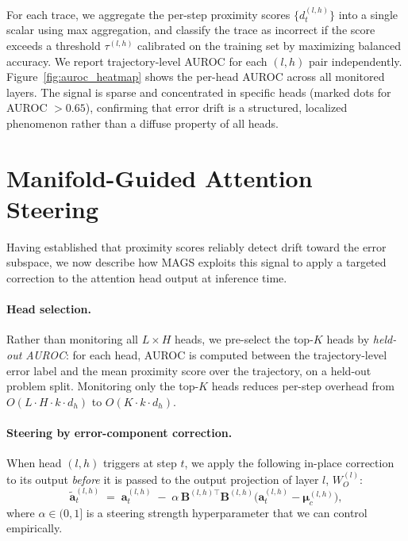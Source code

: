 \documentclass{article}
\newcommand{\ba}{\bm{a}}
\newcommand{\bmu}{\bm{\mu}}
\newcommand{\bB}{\bm{B}}
\begin{document}
For each trace, we aggregate the per-step proximity scores $\{d_t^{(l,h)}\}$ into a single scalar using max aggregation, and classify the trace as incorrect if the score exceeds a threshold  $\tau^{(l,h)}$ calibrated on the training set by maximizing balanced accuracy. We report trajectory-level AUROC for each $(l, h)$ pair independently. Figure~\ref{fig:auroc_heatmap} shows the per-head AUROC across all monitored layers. The signal is sparse and concentrated in specific heads (marked dots for AUROC $> 0.65$), confirming that error drift is a structured, localized phenomenon rather than a diffuse property of all heads.

\section{Manifold-Guided Attention Steering}
\label{sec:steer}
Having established that proximity scores reliably detect drift toward the error subspace, we now describe how MAGS exploits this signal to apply a targeted correction to the attention head output at inference time.

\paragraph{Head selection.}
Rather than monitoring all $L \times H$ heads, we pre-select the top-$K$ heads by \emph{held-out AUROC}: for each head, AUROC is computed between the trajectory-level error label and the mean proximity score over the trajectory, on a held-out problem split. Monitoring only the top-$K$ heads reduces per-step overhead from $O(L \cdot H \cdot k \cdot d_h)$ to $O(K \cdot k \cdot d_h)$.

\paragraph{Steering by error-component correction.} When head $(l,h)$ triggers at step $t$, we apply the following in-place correction to its output \emph{before} it is passed to the output projection of layer $l$, $W_O^{(l)}$:
\begin{equation}
    \tilde{\ba}_t^{(l,h)}
    \;=\;
    \ba_t^{(l,h)}
    \;-\;
    \alpha\,\bB^{(l,h)\top}\bB^{(l,h)}
    \bigl(\ba_t^{(l,h)} - \bmu_c^{(l,h)}\bigr),
    \label{eq:correction}
\end{equation}
where $\alpha \in (0, 1]$ is a steering strength hyperparameter that we can control empirically.
\end{document}
